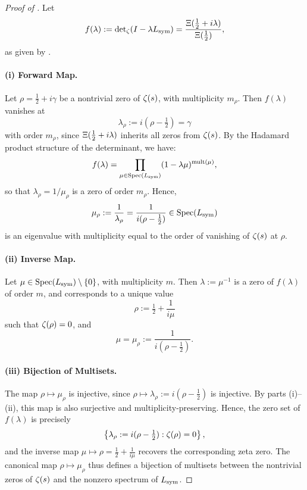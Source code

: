 \begin{proof}[Proof of ]
Let
\[
f(\lambda) := \det\nolimits_\zeta(I - \lambda L_{\mathrm{sym}}) = \frac{\Xi(\tfrac{1}{2} + i\lambda)}{\Xi(\tfrac{1}{2})},
\]
as given by .

\paragraph{(i) Forward Map.}
Let \( \rho = \tfrac{1}{2} + i\gamma \) be a nontrivial zero of \( \zeta(s) \), with multiplicity \( m_\rho \). Then \( f(\lambda) \) vanishes at
\[
\lambda_\rho := i(\rho - \tfrac{1}{2}) = \gamma
\]
with order \( m_\rho \), since \( \Xi(\tfrac{1}{2} + i\lambda) \) inherits all zeros from \( \zeta(s) \). By the Hadamard product structure of the determinant, we have:
\[
f(\lambda) = \prod_{\mu \in \operatorname{Spec}(L_{\mathrm{sym}})} (1 - \lambda \mu)^{\operatorname{mult}(\mu)},
\]
so that \( \lambda_\rho = 1/\mu_\rho \) is a zero of order \( m_\rho \). Hence,
\[
\mu_\rho := \frac{1}{\lambda_\rho} = \frac{1}{i(\rho - \tfrac{1}{2})} \in \operatorname{Spec}(L_{\mathrm{sym}})
\]
is an eigenvalue with multiplicity equal to the order of vanishing of \( \zeta(s) \) at \( \rho \).

\paragraph{(ii) Inverse Map.}
Let \( \mu \in \operatorname{Spec}(L_{\mathrm{sym}}) \setminus \{0\} \), with multiplicity \( m \). Then \( \lambda := \mu^{-1} \) is a zero of \( f(\lambda) \) of order \( m \), and corresponds to a unique value
\[
\rho := \tfrac{1}{2} + \frac{1}{i\mu}
\]
such that \( \zeta(\rho) = 0 \), and
\[
\mu = \mu_\rho := \frac{1}{i(\rho - \tfrac{1}{2})}.
\]

\paragraph{(iii) Bijection of Multisets.}
The map \( \rho \mapsto \mu_\rho \) is injective, since \( \rho \mapsto \lambda_\rho := i(\rho - \tfrac{1}{2}) \) is injective. By parts (i)–(ii), this map is also surjective and multiplicity-preserving. Hence, the zero set of \( f(\lambda) \) is precisely
\[
\left\{ \lambda_\rho := i(\rho - \tfrac{1}{2}) : \zeta(\rho) = 0 \right\},
\]
and the inverse map \( \mu \mapsto \rho = \tfrac{1}{2} + \frac{1}{i\mu} \) recovers the corresponding zeta zero. The canonical map \( \rho \mapsto \mu_\rho \) thus defines a bijection of multisets between the nontrivial zeros of \( \zeta(s) \) and the nonzero spectrum of \( L_{\mathrm{sym}} \).
\end{proof}
